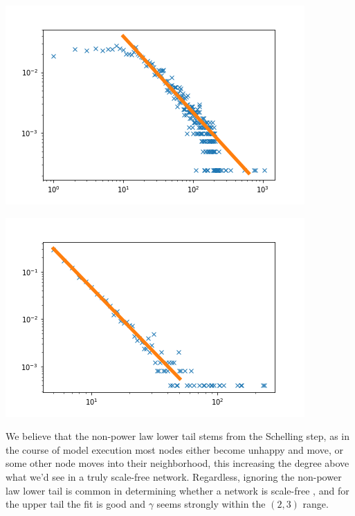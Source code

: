 \documentclass[12pt,twoside]{report}
\begin{document}
\begin{center}
\begin{minipage}{0.45\linewidth}
\includegraphics[width=\linewidth]{figures/degs/facebook.png}
\end{minipage}
\hfill
\begin{minipage}{0.45\linewidth}
\includegraphics[width=\linewidth]{figures/degs/ba.png}
\end{minipage}
\end{center}

We believe that the non-power law lower tail stems from the Schelling step, as in the course of model execution most nodes either become unhappy and move, or some other node moves into their neighborhood, this increasing the degree above what we'd see in a truly scale-free network. Regardless, ignoring the non-power law lower tail is common in determining whether a network is scale-free \cite{broido2019scale}, and for the upper tail the fit is good and $\gamma$ seems strongly within the $(2,3)$ range. \\
\end{document}
